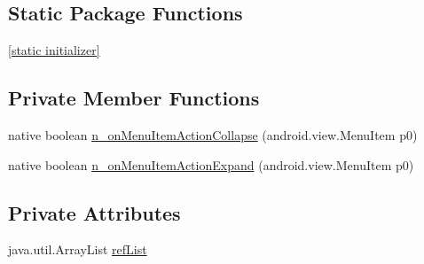\subsection*{Static Package Functions}
\begin{CompactItemize}
\item 
\hyperlink{classmono_1_1android_1_1support_1_1v4_1_1view_1_1_menu_item_compat___on_action_expand_listener_implementor_6250dabf4758bde6b3273fd5de60e22e}{\mbox{[}static initializer\mbox{]}}
\end{CompactItemize}
\subsection*{Private Member Functions}
\begin{CompactItemize}
\item 
native boolean \hyperlink{classmono_1_1android_1_1support_1_1v4_1_1view_1_1_menu_item_compat___on_action_expand_listener_implementor_2ea85b9e8e1320aa7830c56653f8477c}{n\_\-onMenuItemActionCollapse} (android.view.MenuItem p0)
\item 
native boolean \hyperlink{classmono_1_1android_1_1support_1_1v4_1_1view_1_1_menu_item_compat___on_action_expand_listener_implementor_d74c93a2fa0e996bd0707bfd688e9ae5}{n\_\-onMenuItemActionExpand} (android.view.MenuItem p0)
\end{CompactItemize}
\subsection*{Private Attributes}
\begin{CompactItemize}
\item 
java.util.ArrayList \hyperlink{classmono_1_1android_1_1support_1_1v4_1_1view_1_1_menu_item_compat___on_action_expand_listener_implementor_233b3f8875fa2f9d475ae06730e8a32a}{refList}
\end{CompactItemize}


